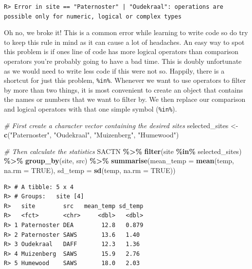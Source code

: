 \documentclass[
]{book}
\newenvironment{Shaded}{\begin{snugshade}}{\end{snugshade}}
\newcommand{\CommentTok}[1]{\textcolor[rgb]{0.56,0.35,0.01}{\textit{#1}}}
\newcommand{\DataTypeTok}[1]{\textcolor[rgb]{0.13,0.29,0.53}{#1}}
\newcommand{\KeywordTok}[1]{\textcolor[rgb]{0.13,0.29,0.53}{\textbf{#1}}}
\newcommand{\NormalTok}[1]{#1}
\newcommand{\OperatorTok}[1]{\textcolor[rgb]{0.81,0.36,0.00}{\textbf{#1}}}
\newcommand{\OtherTok}[1]{\textcolor[rgb]{0.56,0.35,0.01}{#1}}
\newcommand{\StringTok}[1]{\textcolor[rgb]{0.31,0.60,0.02}{#1}}
\begin{document}
\begin{verbatim}
R> Error in site == "Paternoster" | "Oudekraal": operations are possible only for numeric, logical or complex types
\end{verbatim}

Oh no, we broke it! This is a common error while learning to write code so do try to keep this rule in mind as it can cause a lot of headaches. An easy way to spot this problem is if ones line of code has more logical operators than comparison operators you're probably going to have a bad time. This is doubly unfortunate as we would need to write less code if this were not so. Happily, there is a shortcut for just this problem, \texttt{\%in\%}. Whenever we want to use operators to filter by more than two things, it is most convenient to create an object that contains the names or numbers that we want to filter by. We then replace our comparison and logical operators with that one simple symbol (\texttt{\%in\%}).

\begin{Shaded}
\begin{Highlighting}[]
\CommentTok{\# First create a character vector containing the desired sites}
\NormalTok{selected\_sites <{-}}\StringTok{ }\KeywordTok{c}\NormalTok{(}\StringTok{"Paternoster"}\NormalTok{, }\StringTok{"Oudekraal"}\NormalTok{, }\StringTok{"Muizenberg"}\NormalTok{, }\StringTok{"Humewood"}\NormalTok{)}

\CommentTok{\# Then calculate the statistics}
\NormalTok{SACTN }\OperatorTok{\%>\%}\StringTok{ }
\StringTok{  }\KeywordTok{filter}\NormalTok{(site }\OperatorTok{\%in\%}\StringTok{ }\NormalTok{selected\_sites) }\OperatorTok{\%>\%}
\StringTok{  }\KeywordTok{group\_by}\NormalTok{(site, src) }\OperatorTok{\%>\%}\StringTok{ }
\StringTok{  }\KeywordTok{summarise}\NormalTok{(}\DataTypeTok{mean\_temp =} \KeywordTok{mean}\NormalTok{(temp, }\DataTypeTok{na.rm =} \OtherTok{TRUE}\NormalTok{), }
            \DataTypeTok{sd\_temp =} \KeywordTok{sd}\NormalTok{(temp, }\DataTypeTok{na.rm =} \OtherTok{TRUE}\NormalTok{))}
\end{Highlighting}
\end{Shaded}

\begin{verbatim}
R> # A tibble: 5 x 4
R> # Groups:   site [4]
R>   site        src   mean_temp sd_temp
R>   <fct>       <chr>     <dbl>   <dbl>
R> 1 Paternoster DEA        12.8   0.879
R> 2 Paternoster SAWS       13.6   1.40 
R> 3 Oudekraal   DAFF       12.3   1.36 
R> 4 Muizenberg  SAWS       15.9   2.76 
R> 5 Humewood    SAWS       18.0   2.03
\end{verbatim}
\end{document}
